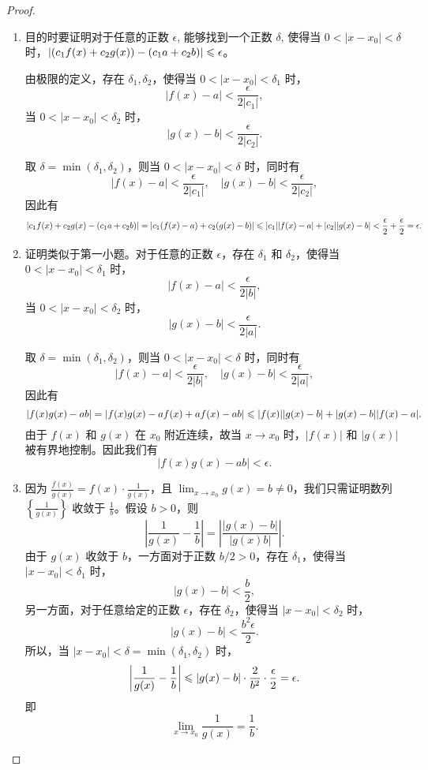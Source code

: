 \begin{proof}
    \begin{enumerate}
        \item 目的时要证明对于任意的正数 $\epsilon$, 能够找到一个正数 $\delta$, 使得当 $0 < |x - x_0| < \delta$ 时，$|(c_1 f(x) + c_2 g(x)) - (c_1 a + c_2 b)| \leqslant \epsilon$。

              由极限的定义，存在 $\delta_1, \delta_2$，使得当 $0 < |x - x_0| < \delta_1$ 时，
              $$|f(x) - a| < \frac{\epsilon}{2|c_1|},$$
              当 $0 < |x - x_0| < \delta_2$ 时，
              $$|g(x) - b| < \frac{\epsilon}{2|c_2|}.$$

              取 $\delta = \min(\delta_1, \delta_2)$，则当 $0 < |x - x_0| < \delta$ 时，同时有
              $$ |f(x) - a| < \frac{\epsilon}{2|c_1|}, \quad |g(x) - b| < \frac{\epsilon}{2|c_2|}, $$
              因此有
              $$ |c_1 f(x) + c_2 g(x) - (c_1 a + c_2 b)| = |c_1(f(x) - a) + c_2(g(x) - b)| \leqslant |c_1| |f(x) - a| + |c_2| |g(x) - b| < \frac{\epsilon}{2} + \frac{\epsilon}{2} = \epsilon. $$

        \item 证明类似于第一小题。对于任意的正数 $\epsilon$，存在 $\delta_1$ 和 $\delta_2$，使得当 $0 < |x - x_0| < \delta_1$ 时，
              $$ |f(x) - a| < \frac{\epsilon}{2|b|}, $$
              当 $0 < |x - x_0| < \delta_2$ 时，
              $$ |g(x) - b| < \frac{\epsilon}{2|a|}. $$

              取 $\delta = \min(\delta_1, \delta_2)$，则当 $0 < |x - x_0| < \delta$ 时，同时有
              $$ |f(x) - a| < \frac{\epsilon}{2|b|}, \quad |g(x) - b| < \frac{\epsilon}{2|a|}, $$
              因此有
              $$ |f(x)g(x) - ab| = |f(x)g(x) - af(x) + af(x) - ab| \leqslant |f(x)| |g(x) - b| + |g(x) - b| |f(x) - a|. $$
              由于 $f(x)$ 和 $g(x)$ 在 $x_0$ 附近连续，故当 $x \to x_0$ 时，$|f(x)|$ 和 $|g(x)|$ 被有界地控制。因此我们有
              $$ |f(x)g(x) - ab| < \epsilon. $$

        \item 因为 $\frac{f(x)}{g(x)} = f(x) \cdot \frac{1}{g(x)}$，且 $\lim_{x \to x_0} g(x) = b \neq 0$，我们只需证明数列 $\left\{\frac{1}{g(x)}\right\}$ 收敛于 $\frac{1}{b}$。假设 $b > 0$，则
              $$ \left| \frac{1}{g(x)} - \frac{1}{b} \right| = \left| \frac{|g(x) - b|}{|g(x) b|} \right|. $$
              由于 $g(x)$ 收敛于 $b$，一方面对于正数 $b/2 > 0$，存在 $\delta_1$，使得当 $|x - x_0| < \delta_1$ 时，
              $$ |g(x) - b| < \frac{b}{2}, $$
              另一方面，对于任意给定的正数 $\epsilon$，存在 $\delta_2$，使得当 $|x - x_0| < \delta_2$ 时，
              $$ |g(x) - b| < \frac{b^2 \epsilon}{2}. $$
              所以，当 $|x - x_0| < \delta = \min(\delta_1, \delta_2)$ 时，
              $$ \left| \frac{1}{g(x)} - \frac{1}{b} \right| \leqslant |g(x) - b| \cdot \frac{2}{b^2} \cdot \frac{\epsilon}{2} = \epsilon. $$
              即
              $$ \lim_{x \to x_0} \frac{1}{g(x)} = \frac{1}{b}. $$
    \end{enumerate}
\end{proof}

